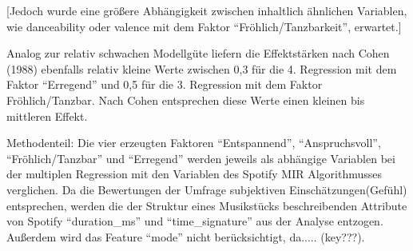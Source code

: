 [Jedoch wurde eine größere Abhängigkeit zwischen inhaltlich ähnlichen Variablen, wie danceability oder valence mit dem Faktor ``Fröhlich/Tanzbarkeit'', erwartet.]


Analog zur relativ schwachen Modellgüte liefern die Effektstärken nach Cohen (1988) ebenfalls relativ kleine Werte zwischen 0,3 für die 4. Regression mit dem Faktor ``Erregend'' und 0,5 für die 3.
Regression mit dem Faktor Fröhlich/Tanzbar.
Nach Cohen entsprechen diese Werte einen kleinen bis mittleren Effekt.


Methodenteil: Die vier erzeugten Faktoren ``Entspannend'', ``Anspruchsvoll'', ``Fröhlich/Tanzbar'' und ``Erregend'' werden jeweils als abhängige Variablen bei der multiplen Regression mit den Variablen des Spotify MIR Algorithmusses verglichen.
Da die Bewertungen der Umfrage subjektiven Einschätzungen(Gefühl) entsprechen, werden die der Struktur eines Musikstücks beschreibenden Attribute von Spotify ``duration\_ms'' und ``time\_signature'' aus der Analyse entzogen.
Außerdem wird das Feature ``mode'' nicht berücksichtigt, da..... (key???).
